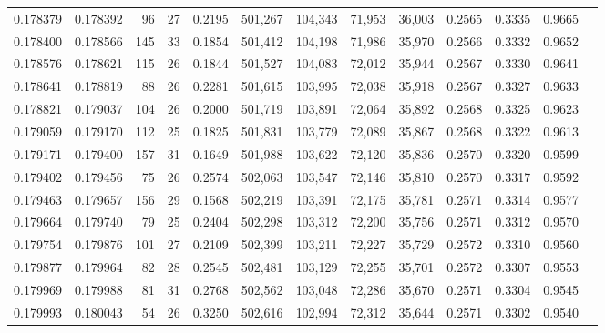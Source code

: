 \begin{tabular}{rrrrrrrrrrrrr}
0.178379 & 0.178392 &    96 &  27 &                                     0.2195 & 501,267 & 104,343 &  71,953 &  36,003 & 0.2565 & 0.3335 & 0.9665 \\
0.178400 & 0.178566 &   145 &  33 &                                     0.1854 & 501,412 & 104,198 &  71,986 &  35,970 & 0.2566 & 0.3332 & 0.9652 \\
0.178576 & 0.178621 &   115 &  26 &                                     0.1844 & 501,527 & 104,083 &  72,012 &  35,944 & 0.2567 & 0.3330 & 0.9641 \\
0.178641 & 0.178819 &    88 &  26 &                                     0.2281 & 501,615 & 103,995 &  72,038 &  35,918 & 0.2567 & 0.3327 & 0.9633 \\
0.178821 & 0.179037 &   104 &  26 &                                     0.2000 & 501,719 & 103,891 &  72,064 &  35,892 & 0.2568 & 0.3325 & 0.9623 \\
0.179059 & 0.179170 &   112 &  25 &                                     0.1825 & 501,831 & 103,779 &  72,089 &  35,867 & 0.2568 & 0.3322 & 0.9613 \\
0.179171 & 0.179400 &   157 &  31 &                                     0.1649 & 501,988 & 103,622 &  72,120 &  35,836 & 0.2570 & 0.3320 & 0.9599 \\
0.179402 & 0.179456 &    75 &  26 &                                     0.2574 & 502,063 & 103,547 &  72,146 &  35,810 & 0.2570 & 0.3317 & 0.9592 \\
0.179463 & 0.179657 &   156 &  29 &                                     0.1568 & 502,219 & 103,391 &  72,175 &  35,781 & 0.2571 & 0.3314 & 0.9577 \\
0.179664 & 0.179740 &    79 &  25 &                                     0.2404 & 502,298 & 103,312 &  72,200 &  35,756 & 0.2571 & 0.3312 & 0.9570 \\
0.179754 & 0.179876 &   101 &  27 &                                     0.2109 & 502,399 & 103,211 &  72,227 &  35,729 & 0.2572 & 0.3310 & 0.9560 \\
0.179877 & 0.179964 &    82 &  28 &                                     0.2545 & 502,481 & 103,129 &  72,255 &  35,701 & 0.2572 & 0.3307 & 0.9553 \\
0.179969 & 0.179988 &    81 &  31 &                                     0.2768 & 502,562 & 103,048 &  72,286 &  35,670 & 0.2571 & 0.3304 & 0.9545 \\
0.179993 & 0.180043 &    54 &  26 &                                     0.3250 & 502,616 & 102,994 &  72,312 &  35,644 & 0.2571 & 0.3302 & 0.9540 \\

\end{tabular}
